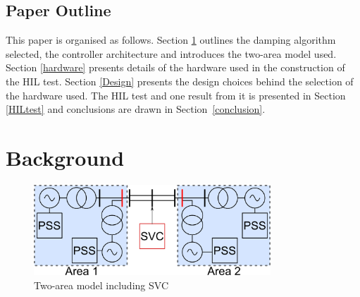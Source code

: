 \documentclass[conference]{IEEEtran}
\begin{document}




\subsection{Paper Outline}
This paper is organised as follows. Section \ref{background} outlines the damping algorithm selected, the controller architecture and introduces the two-area model used. Section \ref{hardware} presents details of the hardware used in the construction of the HIL test. Section \ref{Design} presents the design choices behind the selection of the hardware used. The HIL test and one result from it is presented in Section \ref{HILtest} and conclusions are drawn in Section~\ref{conclusion}.

\section{Background}\label{background}

\begin{figure}[!h]
\centering
\includegraphics[width=3.5in]{TwoArea.png} 
\caption{Two-area model including SVC}
\label{TwoArea}
\end{figure}
\end{document}
